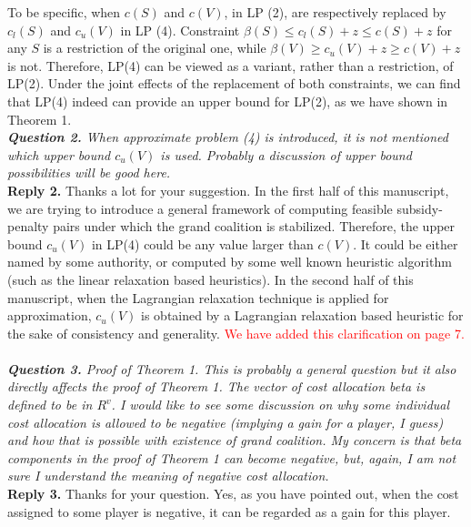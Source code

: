 \documentclass[11pt]{article}
\begin{document}
To be specific, when $c(S)$ and $c(V)$, in LP (2), are respectively replaced by $c_l(S)$ and $c_u(V)$ in LP (4).
Constraint $\beta(S) \leq c_l(S) + z \leq c(S) + z$ for any $S$ is a restriction of the original one, while $\beta(V) \geq c_u(V) + z \geq c(V) + z$ is not.
Therefore, LP(4) can be viewed as a variant, rather than a restriction, of LP(2).
Under the joint effects of the replacement of both constraints, we can find that LP(4) indeed can provide an upper bound for LP(2), as we have shown in Theorem 1.
\\[4mm]
%
%
%
\noindent \textit{\textbf{Question 2.}
When approximate problem (4) is introduced, it is not mentioned which upper bound $c_u(V)$ is used. Probably a discussion of upper bound possibilities will be good here.}
\\[2mm]
\noindent \textbf{Reply 2.}
Thanks a lot for your suggestion. 
In the first half of this manuscript, we are trying to introduce a general framework of computing feasible subsidy-penalty pairs under which the grand coalition is stabilized.
Therefore, the upper bound $c_u(V)$ in LP(4) could be any value larger than $c(V)$.
It could be either named by some authority, or computed by some well known heuristic algorithm (such as the linear relaxation based heuristics).
In the second half of this manuscript, when the Lagrangian relaxation technique is applied for approximation, $c_u(V)$ is obtained by a Lagrangian relaxation based heuristic for the sake of consistency and generality.
\textcolor{red}{We have added this clarification on page 7.}
~\\[4mm]
%
%
%
\noindent \textit{\textbf{Question 3.}
Proof of Theorem 1. This is probably a general question but it also directly affects the proof of Theorem 1. The vector of cost allocation beta is defined to be in $R^v$.
I would like to see some discussion on why some individual cost allocation is allowed to be negative (implying a gain for a player, I guess) and how that is possible with existence of grand coalition. My concern is that beta components in the proof of Theorem 1 can become negative, but, again, I am not sure I understand the meaning of negative cost allocation.}
\\[2mm]
\noindent \textbf{Reply 3.}
Thanks for your question. 
Yes, as you have pointed out, when the cost assigned to some player is negative, it can be regarded as a gain for this player.
\end{document}
